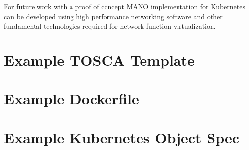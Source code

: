 \documentclass[12pt,oneandhalf,chaparabic,ceng,ms,eng,oneside,pntc]{gsufbe}
\begin{document}
For future work with a proof of concept MANO implementation for Kubernetes can be developed using high
performance networking software and other fundamental technologies required for network function
virtualization.




\appendix
\lstset{%
   breaklines=true,
}
\thispagestyle{empty}
\chapter[]{Example TOSCA Template}
\thispagestyle{empty}
\label{appendix:tosca}

\newpage


\chapter[]{Example Dockerfile}
\thispagestyle{empty}
\label{appendix:docker}


\chapter[]{Example Kubernetes Object Spec}
\thispagestyle{empty}
\label{appendix:k8spec}

\newpage




\thispagestyle{empty}
\end{document}
